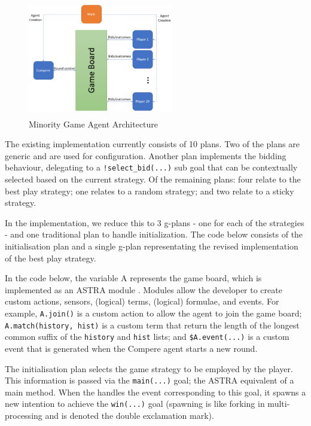 \begin{figure}[!tbh]
\centering
\includegraphics[height=2in, width=2.5in]{mg.png}
\caption{Minority Game Agent Architecture}
\label{fig:mgagents}
\end{figure}

The existing implementation currently consists of 10 plans. Two of the plans are generic and are
used for configuration. Another plan implements the bidding behaviour, delegating to a 
\verb|!select_bid(...)| sub goal that can be contextually selected based on the current strategy.
Of the remaining plans: four relate to the best play strategy; one relates to a random strategy;
and two relate to a sticky strategy.


In the {\aser} implementation, we reduce this to 3 g-plans - one for each of the strategies - 
and one traditional plan to handle initialization. The code below consists of the initialisation 
plan and a single g-plan representating the revised implementation of the best play strategy.

In the code below, the variable A represents the game board, which is implemented as an ASTRA module 
\cite{DBLP:conf/prima/CollierRL15}. Modules allow the developer to create custom actions, 
sensors, (logical) terms, (logical) formulae, and events. For example, \verb|A.join()| is a 
custom action to allow the agent to join the game board; \verb|A.match(history, hist)| is a 
custom term that return the length of the longest common suffix of the \verb|history| and 
\verb|hist| lists; and \verb|$A.event(...)| is a custom event that is generated when the 
Compere agent starts a new round.

The initialisation plan selects the game strategy to be employed by the player. This information
 is passed via the \verb|main(...)| goal; the ASTRA equivalent of a main method. When the handles
the event corresponding to this goal, it spawns a new intention to achieve the \verb|win(...)| 
goal (spawning is like forking in multi-processing and is denoted the double exclamation mark).

